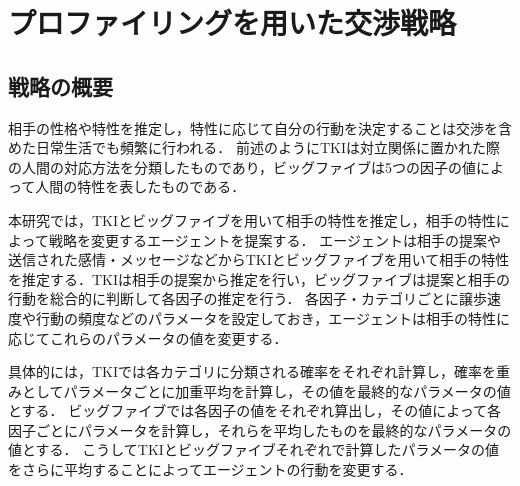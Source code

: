 

\chapter{プロファイリングを用いた交渉戦略}
\section{戦略の概要}
相手の性格や特性を推定し，特性に応じて自分の行動を決定することは交渉を含めた日常生活でも頻繁に行われる．
前述のようにTKIは対立関係に置かれた際の人間の対応方法を分類したものであり，ビッグファイブは5つの因子の値によって人間の特性を表したものである．

本研究では，TKIとビッグファイブを用いて相手の特性を推定し，相手の特性によって戦略を変更するエージェントを提案する．
エージェントは相手の提案や送信された感情・メッセージなどからTKIとビッグファイブを用いて相手の特性を推定する．TKIは相手の提案から推定を行い，ビッグファイブは提案と相手の行動を総合的に判断して各因子の推定を行う．
各因子・カテゴリごとに譲歩速度や行動の頻度などのパラメータを設定しておき，エージェントは相手の特性に応じてこれらのパラメータの値を変更する．

具体的には，TKIでは各カテゴリに分類される確率をそれぞれ計算し，確率を重みとしてパラメータごとに加重平均を計算し，その値を最終的なパラメータの値とする．
ビッグファイブでは各因子の値をそれぞれ算出し，その値によって各因子ごとにパラメータを計算し，それらを平均したものを最終的なパラメータの値とする．
こうしてTKIとビッグファイブそれぞれで計算したパラメータの値をさらに平均することによってエージェントの行動を変更する．

